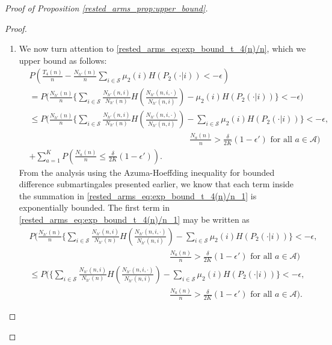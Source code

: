 \begin{proof}[Proof of Proposition \ref{rested_arms_prop:upper_bound}]
\begin{proof}
\begin{enumerate}
\item We now turn attention to \eqref{rested_arms_eq:exp_bound_t_4(n)/n}, which we upper bound as follows:
\begingroup\allowdisplaybreaks\begin{align}
	&P\left(\frac{T_4(n)}{n}-\frac{N_{h'}(n)}{n}\sum\limits_{i\in\mathcal{S}}\mu_2(i)H(P_2(\cdot|i))<-\epsilon\right)\nonumber\\
	&=P\bigg(\frac{N_{h'}(n)}{n}\bigg\lbrace\sum\limits_{i\in\mathcal{S}}\frac{N_{h'}(n,i)}{N_{h'}(n)}H\left(\frac{N_{h'}(n,i,\cdot)}{N_{h'}(n,i)}\right)
	-\mu_2(i)H(P_2(\cdot|i))\bigg\rbrace<-\epsilon\bigg)\nonumber\\
	&\leq P\bigg(\frac{N_{h'}(n)}{n}\bigg\lbrace\sum\limits_{i\in\mathcal{S}}\frac{N_{h'}(n,i)}{N_{h'}(n)}H\left(\frac{N_{h'}(n,i,\cdot)}{N_{h'}(n,i)}\right)
	-\sum\limits_{i\in\mathcal{S}}\mu_2(i)H(P_2(\cdot|i))\bigg\rbrace<-\epsilon,\nonumber\\
	&\hspace{8cm}\frac{N_a(n)}{n}>\frac{\delta}{2K}(1-\epsilon')\text{ for all }a\in\mathcal{A}\bigg)\nonumber\\
	&+\sum\limits_{a=1}^{K}P\left(\frac{N_a(n)}{n}\leq\frac{\delta}{2K}(1-\epsilon')\right).\label{rested_arms_eq:exp_bound_t_4(n)/n_1}
\end{align}\endgroup
From the analysis using the Azuma-Hoeffding inequality for bounded difference submartingales presented earlier, we know that each term inside the summation in \eqref{rested_arms_eq:exp_bound_t_4(n)/n_1} is exponentially bounded. The first term in \eqref{rested_arms_eq:exp_bound_t_4(n)/n_1} may be written as
\begingroup\allowdisplaybreaks\begin{align}
	&P\bigg(\frac{N_{h'}(n)}{n}\bigg\lbrace\sum\limits_{i\in\mathcal{S}}\frac{N_{h'}(n,i)}{N_{h'}(n)}H\left(\frac{N_{h'}(n,i,\cdot)}{N_{h'}(n,i)}\right)
	-\sum\limits_{i\in\mathcal{S}}\mu_2(i)H(P_2(\cdot|i))\bigg\rbrace<-\epsilon,\nonumber\\
	&\hspace{7cm}\frac{N_a(n)}{n}>\frac{\delta}{2K}(1-\epsilon')\text{ for all }a\in\mathcal{A}\bigg)\nonumber\\
	&\leq P\bigg(\bigg\lbrace\sum\limits_{i\in\mathcal{S}}\frac{N_{h'}(n,i)}{N_{h'}(n)}H\left(\frac{N_{h'}(n,i,\cdot)}{N_{h'}(n,i)}\right)
	-\sum\limits_{i\in\mathcal{S}}\mu_2(i)H(P_2(\cdot|i))\bigg\rbrace<-{\epsilon},\nonumber\\
	&\hspace{7cm}\frac{N_a(n)}{n}>\frac{\delta}{2K}(1-\epsilon')\text{ for all }a\in\mathcal{A}\bigg).\label{rested_arms_eq:exp_bound_t_4(n)/n_2}

\end{align}
\end{enumerate}
\end{proof}
\end{proof}
